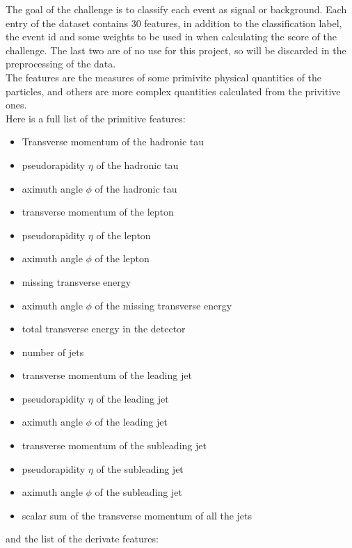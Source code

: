 \documentclass[12pt]{article}
\begin{document}
The goal of the challenge is to classify each event as signal or background. Each entry of the dataset
contains $30$ features, in addition to the classification label, the event id and some weights to be used
in when calculating the score of the challenge. The last two are of no use for this project, so will be 
discarded in the preprocessing of the data. \\
The features are the measures of some primivite physical quantities of the particles, and others are more
complex quantities calculated from the privitive ones. \\
Here is a full list of the primitive features:
\begin{itemize}
  \item Transverse momentum of the hadronic tau
  \item pseudorapidity $\eta$ of the hadronic tau
  \item aximuth angle $\phi$ of the hadronic tau
  \item transverse momentum of the lepton
  \item pseudorapidity $\eta$ of the lepton
  \item aximuth angle $\phi$ of the lepton
  \item missing transverse energy
  \item aximuth angle $\phi$ of the missing transverse energy
  \item total transverse energy in the detector
  \item number of jets
  \item transverse momentum of the leading jet
  \item pseudorapidity $\eta$ of the leading jet
  \item aximuth angle $\phi$ of the leading jet
  \item transverse momentum of the subleading jet
  \item pseudorapidity $\eta$ of the subleading jet
  \item aximuth angle $\phi$ of the subleading jet
  \item scalar sum of the transverse momentum of all the jets
\end{itemize}
and the list of the derivate features:
\end{document}
